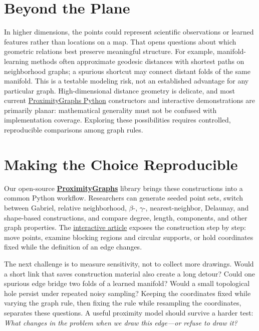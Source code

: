 \documentclass[10pt,letterpaper]{article}
\begin{document}
\clearpage\section*{Beyond the Plane}
\noindent
In higher dimensions, the points could represent scientific observations or learned features rather than locations on a map. That opens questions about which geometric relations best preserve meaningful structure. For example, manifold-learning methods often approximate geodesic distances with shortest paths on neighborhood graphs; a spurious shortcut may connect distant folds of the same manifold. This is a testable modeling risk, not an established advantage for any particular graph. High-dimensional distance geometry is delicate, and most current \href{https://github.com/ProximityGraphs/ProximityGraphs}{ProximityGraphs Python} constructors and interactive demonstrations are primarily planar: mathematical generality must not be confused with implementation coverage. Exploring these possibilities requires controlled, reproducible comparisons among graph rules.

\section*{Making the Choice Reproducible}

Our open-source \href{https://pypi.org/project/proximitygraphs/}{\textbf{ProximityGraphs}} library brings these constructions into a common Python workflow. Researchers can generate seeded point sets, switch between Gabriel, relative neighborhood, $\beta$-, $\gamma$-, nearest-neighbor, Delaunay, and shape-based constructions, and compare degree, length, components, and other graph properties. The \href{https://heri-espino.github.io/proximitygraphs-siam-figures/article.html}{interactive article} exposes the construction step by step: move points, examine blocking regions and circular supports, or hold coordinates fixed while the definition of an edge changes.

The next challenge is to measure sensitivity, not to collect more drawings. Would a short link that saves construction material also create a long detour? Could one spurious edge bridge two folds of a learned manifold? Would a small topological hole persist under repeated noisy sampling? Keeping the coordinates fixed while varying the graph rule, then fixing the rule while resampling the coordinates, separates these questions. A useful proximity model should survive a harder test: \emph{What changes in the problem when we draw this edge---or refuse to draw it?}
\end{document}
